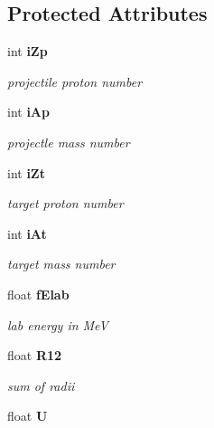 \subsection*{Protected Attributes}
\begin{CompactItemize}
\item 
int \bf{i\-Zp}\label{classCFus_6abbb7c5112c1b4ac959280c9a5524cc}

\begin{CompactList}\small\item\em projectile proton number \item\end{CompactList}\item 
int \bf{i\-Ap}\label{classCFus_f3c66194c6dd8e38625e9565e8e54c27}

\begin{CompactList}\small\item\em projectle mass number \item\end{CompactList}\item 
int \bf{i\-Zt}\label{classCFus_dc7e6da2c4abe89065f7d6cf8f2a5549}

\begin{CompactList}\small\item\em target proton number \item\end{CompactList}\item 
int \bf{i\-At}\label{classCFus_1107c21a62be743bd8d53eeff6846ab7}

\begin{CompactList}\small\item\em target mass number \item\end{CompactList}\item 
float \bf{f\-Elab}\label{classCFus_a7f55f2d08e5073b5d5ea3fe121f4bd6}

\begin{CompactList}\small\item\em lab energy in Me\-V \item\end{CompactList}\item 
float \bf{R12}\label{classCFus_7ca80582c5de6b4956fe7f52a1d1370a}

\begin{CompactList}\small\item\em sum of radii \item\end{CompactList}\item 
float \bf{U}\label{classCFus_a8489fe6dc98dbcdb4754ae2a068e85e}


\end{CompactItemize}

